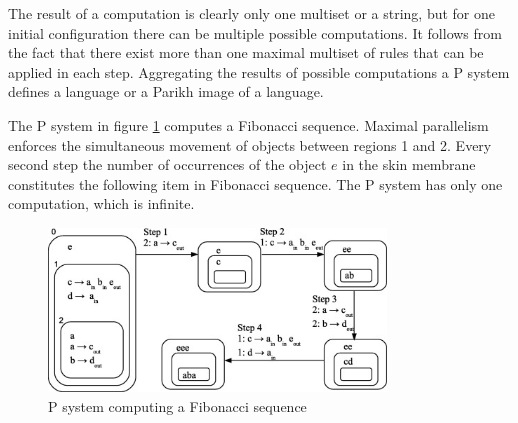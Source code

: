 The result of a computation is clearly only one multiset or a string, but for one initial configuration there can be multiple possible computations. It follows from the fact that there exist more than one maximal multiset of rules that can be applied in each step. Aggregating the results of possible computations a P system defines a language or a Parikh image of a language. 

\begin{example}
  The P system in figure \ref{fig:p_system_fibonacci} computes a Fibonacci sequence. Maximal parallelism enforces the simultaneous movement of objects between regions 1 and 2. Every second step the number of occurrences of the object $e$ in the skin membrane constitutes the following item in Fibonacci sequence. The P system has only one computation, which is infinite.
\end{example}

\begin{figure}[ht]
  \centering
  \includegraphics[width=0.8\textwidth]{img/p_system_fibonacci.jpg}
  \caption{P system computing a Fibonacci sequence \cite{Buiu201233PSystemFibonacci}}
  \label{fig:p_system_fibonacci}
\end{figure}

